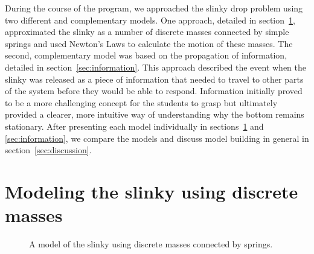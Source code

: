 \documentclass[prb,preprint,superscriptaddress]{revtex4-1}
\renewcommand{\sec}[1]{section~\ref{sec:#1}}
\newcommand{\secs}[2]{sections~\ref{sec:#1} and \ref{sec:#2}}
\begin{document}
During the course of the program, we approached the slinky drop problem using two different
and  complementary models.
One approach, detailed in \sec{forces}, approximated
the slinky as a number of discrete masses connected by simple springs and used
 Newton's Laws to calculate the motion of these masses.
The second, complementary
model was based on the propagation of information, detailed in \sec{information}. This approach
described the event when the slinky was released as a piece of information that
needed to travel to other parts of the system before they would be able to respond.
Information initially proved to be a more challenging concept for the
students to grasp but ultimately provided a clearer, more intuitive way of understanding why the bottom
remains stationary. After presenting each
model individually in \secs{forces}{information}, we compare the models and
discuss model building in general in \sec{discussion}.

\section{Modeling the slinky using discrete masses}
\label{sec:forces}

\begin{figure}[t]
\centering


\caption{A model of the slinky using discrete masses connected by springs.}
\label{fig:discrete}
\end{figure}
\end{document}

